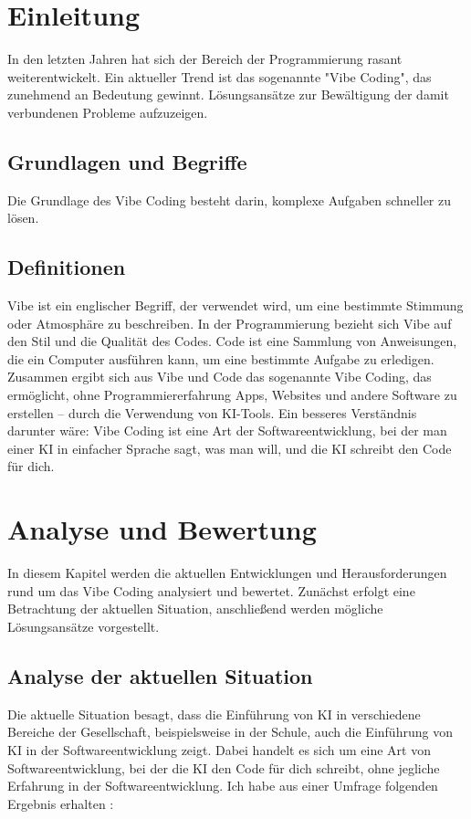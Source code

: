 \documentclass[paper=a4,fontsize=12pt,ngerman]{scrartcl}
\begin{document}
\section{Einleitung}
In den letzten Jahren hat sich der Bereich der Programmierung rasant weiterentwickelt.
Ein aktueller Trend ist das sogenannte "Vibe Coding", das zunehmend an Bedeutung gewinnt.
Lösungsansätze zur Bewältigung der damit verbundenen Probleme aufzuzeigen.

\subsection{Grundlagen und Begriffe}
Die Grundlage des Vibe Coding besteht darin, komplexe Aufgaben schneller zu lösen.

\subsection{Definitionen}
Vibe ist ein englischer Begriff, der verwendet wird, um eine bestimmte Stimmung oder Atmosphäre zu beschreiben.
In der Programmierung bezieht sich Vibe auf den Stil und die Qualität des Codes.
Code ist eine Sammlung von Anweisungen, die ein Computer ausführen kann, um eine bestimmte Aufgabe zu erledigen.
Zusammen ergibt sich aus Vibe und Code das sogenannte Vibe Coding, das ermöglicht,
ohne Programmiererfahrung Apps, Websites und andere Software zu erstellen – durch die Verwendung von KI-Tools. 
Ein besseres Verständnis darunter wäre:
Vibe Coding ist eine Art der Softwareentwicklung, bei der man einer KI in einfacher Sprache sagt, was man will, und die KI schreibt den Code für dich. \citep{Datacamp}

\newpage
\clearpage
\section{Analyse und Bewertung}
In diesem Kapitel werden die aktuellen Entwicklungen und Herausforderungen rund um das Vibe Coding analysiert und bewertet. Zunächst erfolgt eine Betrachtung der aktuellen Situation, anschließend werden mögliche Lösungsansätze vorgestellt.

\subsection{Analyse der aktuellen Situation}
Die aktuelle Situation besagt, dass die Einführung von KI in verschiedene Bereiche der Gesellschaft, 
beispielsweise in der Schule, auch die Einführung von KI in der Softwareentwicklung zeigt. 
Dabei handelt es sich um eine Art von Softwareentwicklung, bei der die KI den Code für dich schreibt,
ohne jegliche Erfahrung in der Softwareentwicklung. Ich habe aus einer Umfrage folgenden Ergebnis erhalten : 
\end{document}
